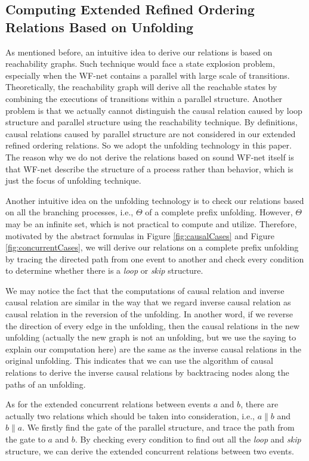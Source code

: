 \documentclass[dvips,...]{llncs}
\begin{document}
\subsection{Computing Extended Refined Ordering Relations Based on Unfolding}\label{subsec:computationOfRelations}
As mentioned before, an intuitive idea to derive our relations is based on reachability graphs. Such technique would face a state explosion problem, especially when the WF-net contains a parallel with large scale of transitions. Theoretically, the reachability graph will derive all the reachable states by combining the executions of transitions within a parallel structure. Another problem is that we actually cannot distinguish the causal relation caused by loop structure and parallel structure using the reachability technique. By definitions, causal relations caused by parallel structure are not considered in our extended refined ordering relations. So we adopt the unfolding technology in this paper. The reason why we do not derive the relations based on sound WF-net itself is that WF-net describe the structure of a process rather than behavior, which is just the focus of unfolding technique.

Another intuitive idea on the unfolding technology is to check our relations based on all the branching processes, i.e., $\Theta$ of a complete prefix unfolding. However, $\Theta$ may be an infinite set, which is not practical to compute and utilize. Therefore, motivated by the abstract formulas in Figure \ref{fig:causalCases} and Figure \ref{fig:concurrentCases}, we will derive our relations on a complete prefix unfolding by tracing the directed path from one event to another and check every condition to determine whether there is a \textit{loop} or \textit{skip} structure.

We may notice the fact that the computations of causal relation and inverse causal relation are similar in the way that we regard inverse causal relation as causal relation in the reversion of the unfolding. In another word, if we reverse the direction of every edge in the unfolding, then the causal relations in the new unfolding (actually the new graph is not an unfolding, but we use the saying to explain our computation here) are the same as the inverse causal relations in the original unfolding. This indicates that we can use the algorithm of causal relations to derive the inverse causal relations by backtracing nodes along the paths of an unfolding.

As for the extended concurrent relations between events $a$ and $b$, there are actually two relations which should be taken into consideration, i.e., $a\parallel b$ and $b\parallel a$. We firstly find the gate of the parallel structure, and trace the path from the gate to $a$ and $b$. By checking every condition to find out all the \textit{loop} and \textit{skip} structure, we can derive the extended concurrent relations between two events.
\end{document}
